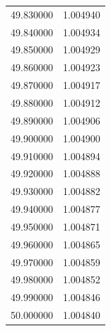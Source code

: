 \begin{tabular}{rr}
49.830000 & 1.004940 \\
49.840000 & 1.004934 \\
49.850000 & 1.004929 \\
49.860000 & 1.004923 \\
49.870000 & 1.004917 \\
49.880000 & 1.004912 \\
49.890000 & 1.004906 \\
49.900000 & 1.004900 \\
49.910000 & 1.004894 \\
49.920000 & 1.004888 \\
49.930000 & 1.004882 \\
49.940000 & 1.004877 \\
49.950000 & 1.004871 \\
49.960000 & 1.004865 \\
49.970000 & 1.004859 \\
49.980000 & 1.004852 \\
49.990000 & 1.004846 \\
50.000000 & 1.004840 \\
\bottomrule
\end{tabular}
